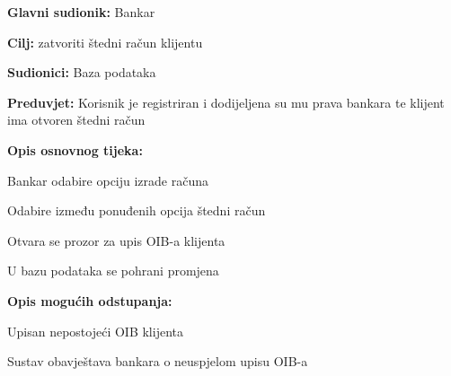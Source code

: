 \noindent {}
\begin{packed_item}

  \item \textbf{Glavni sudionik: }Bankar
  \item  \textbf{Cilj:} zatvoriti štedni račun klijentu
  \item  \textbf{Sudionici:} Baza podataka
  \item  \textbf{Preduvjet:} Korisnik je registriran i dodijeljena su mu prava bankara te klijent ima otvoren štedni račun
  \item  \textbf{Opis osnovnog tijeka:}
  
  \item[] \begin{packed_enum}

    \item Bankar odabire opciju izrade računa 
    \item Odabire između  ponuđenih opcija štedni račun
    \item Otvara se prozor za upis OIB-a klijenta
    \item U bazu podataka se pohrani promjena
  \end{packed_enum}
  
  \item  \textbf{Opis mogućih odstupanja:}
  
  \item[] \begin{packed_item}

    \item[3.a] Upisan nepostojeći OIB klijenta
    \item[] \begin{packed_enum}
      
      \item Sustav obavještava bankara o neuspjelom upisu OIB-a
      
    \end{packed_enum}
    
  \end{packed_item}
\end{packed_item}


